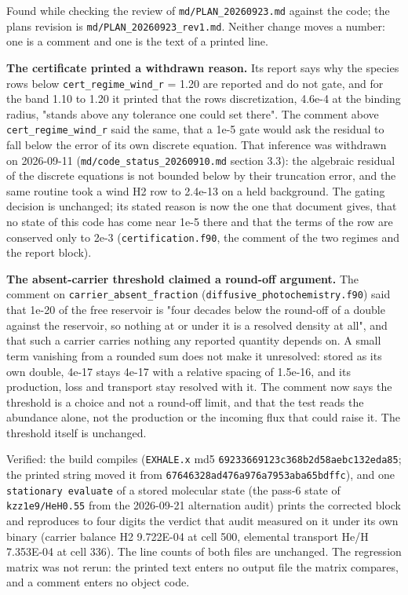 \documentclass[english,a4paper]{my_memo}
\begin{document}
Found while checking the review of \texttt{md/PLAN\_20260923.md} against the code;
the plan\textquotesingle s revision is \texttt{md/PLAN\_20260923\_rev1.md}. Neither change moves a
number: one is a comment and one is the text of a printed line.

\textbf{The certificate printed a withdrawn reason.} Its report says why the
species rows below \texttt{cert\_regime\_wind\_r} = 1.20 are reported and do not gate,
and for the band 1.10 to 1.20 it printed that the row\textquotesingle s discretization, 4.6e-4
at the binding radius, "stands above any tolerance one could set there". The
comment above \texttt{cert\_regime\_wind\_r} said the same, that a 1e-5 gate would ask
the residual to fall below the error of its own discrete equation. That
inference was withdrawn on 2026-09-11 (\texttt{md/code\_status\_20260910.md} section
3.3): the algebraic residual of the discrete equations is not bounded below by
their truncation error, and the same routine took a wind H2 row to 2.4e-13 on
a held background. The gating decision is unchanged; its stated reason is now
the one that document gives, that no state of this code has come near 1e-5
there and that the terms of the row are conserved only to 2e-3
(\texttt{certification.f90}, the comment of the two regimes and the report block).

\textbf{The absent-carrier threshold claimed a round-off argument.} The comment on
\texttt{carrier\_absent\_fraction} (\texttt{diffusive\_photochemistry.f90}) said that 1e-20 of
the free reservoir is "four decades below the round-off of a double against
the reservoir, so nothing at or under it is a resolved density at all", and
that such a carrier carries nothing any reported quantity depends on. A small
term vanishing from a rounded sum does not make it unresolved: stored as its
own double, 4e-17 stays 4e-17 with a relative spacing of 1.5e-16, and its
production, loss and transport stay resolved with it. The comment now says the
threshold is a choice and not a round-off limit, and that the test reads the
abundance alone, not the production or the incoming flux that could raise it.
The threshold itself is unchanged.

Verified: the build compiles (\texttt{EXHALE.x} md5
\texttt{69233669123c368b2d58aebc132eda85}; the printed string moved it from
\texttt{67646328ad476a976a7953aba65bdffc}), and one \texttt{stationary\ evaluate} of a stored
molecular state (the pass-6 state of \texttt{kzz1e9/HeH0.55} from the 2026-09-21
alternation audit) prints the corrected block and reproduces to four digits
the verdict that audit measured on it under its own binary (carrier balance H2
9.722E-04 at cell 500, elemental transport He/H 7.353E-04 at cell 336). The line counts of both files are
unchanged. The regression matrix was not rerun: the printed text enters no
output file the matrix compares, and a comment enters no object code.
\end{document}

